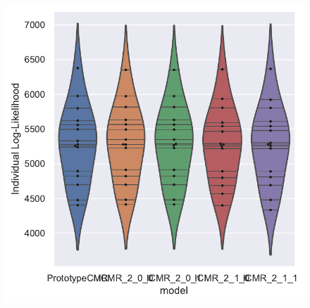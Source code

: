 \documentclass[
  letterpaper,
  DIV=11,
  numbers=noendperiod]{scrreport}
\begin{document}
\begin{figure}

\begin{minipage}[c]{\linewidth}

{\centering 

\includegraphics{./figures/individual_Murdock1962.pdf}

}

\end{minipage}%
\newline
\begin{minipage}[c]{\linewidth}

{\centering 

}
\end{minipage}
\end{figure}
\end{document}
